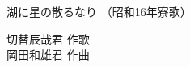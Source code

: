 \documentclass[10pt,b5j]{tarticle} %
\begin{document}
\begin{minipage}[c]{0.7\hsize} %
    \begin{center}
        {\LARGE
            湖に星の散るなり %
        }
        {\small 
            （昭和16年寮歌） %
        }
    \end{center}
\end{minipage}
\begin{minipage}[c]{0.3\hsize} %
    \begin{flushright} %
        切替辰哉君 作歌\\岡田和雄君 作曲 %
    \end{flushright}
\end{minipage}
\end{document}
